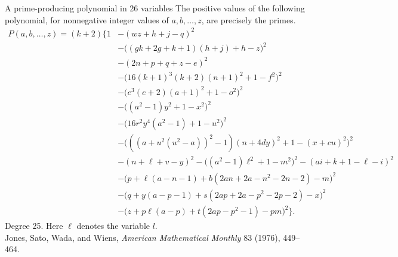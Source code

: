 \documentclass[aspectratio=169,11pt]{beamer}
\begin{document}

\begin{frame}{A prime-producing polynomial in 26 variables}
The positive values of the following polynomial, for nonnegative integer values of $a,b,\ldots,z$, are precisely the primes.
\vspace{1pt}
\begingroup\fontsize{4.5}{5}\selectfont\setlength{\jot}{0pt}
\[
\begin{aligned}
P(a,b,\ldots,z)=(k+2)\bigl\{1
&-(wz+h+j-q)^2\\
&-\bigl((gk+2g+k+1)(h+j)+h-z\bigr)^2\\
&-(2n+p+q+z-e)^2\\
&-\bigl(16(k+1)^3(k+2)(n+1)^2+1-f^2\bigr)^2\\
&-\bigl(e^3(e+2)(a+1)^2+1-o^2\bigr)^2\\
&-\bigl((a^2-1)y^2+1-x^2\bigr)^2\\
&-\bigl(16r^2y^4(a^2-1)+1-u^2\bigr)^2\\
&-\bigl(((a+u^2(u^2-a))^2-1)(n+4dy)^2+1-(x+cu)^2\bigr)^2\\
&-(n+\ell+v-y)^2-\bigl((a^2-1)\ell^2+1-m^2\bigr)^2-(ai+k+1-\ell-i)^2\\
&-\bigl(p+\ell(a-n-1)+b(2an+2a-n^2-2n-2)-m\bigr)^2\\
&-\bigl(q+y(a-p-1)+s(2ap+2a-p^2-2p-2)-x\bigr)^2\\
&-\bigl(z+p\ell(a-p)+t(2ap-p^2-1)-pm\bigr)^2\bigr\}.
\end{aligned}
\]
\endgroup
\vspace{1pt}
{\scriptsize Degree 25. Here $\ell$ denotes the variable $l$.\\
Jones, Sato, Wada, and Wiens, \emph{American Mathematical Monthly} 83 (1976), 449--464.}
\end{frame}
\end{document}

